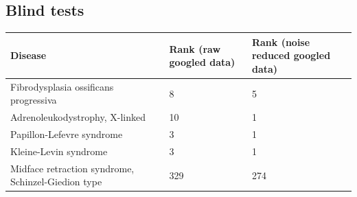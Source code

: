 \documentclass[10pt,letterpaper,final]{article}
\begin{document}
\newpage
\subsection{Blind tests}

\begin{center}
\begin{small}
	\begin{tabular}{|p{3.5cm}|p{1.8cm}|p{1.8cm}|}
	\hline
	\textbf{Disease}  & \textbf{Rank (raw googled data)} & \textbf{Rank (noise reduced googled data)} \\
	\hline\hline
    Fibrodysplasia ossificans progressiva & 8 & 5\\
    \hline
    Adrenoleukodystrophy, X-linked & 10 & 1 \\
    \hline
    Papillon-Lefevre syndrome & 3 & 1\\
    \hline
    Kleine-Levin syndrome  & 3 & 1\\
    \hline
    Midface retraction syndrome, Schinzel-Giedion type  & 329 & 274\\
    \hline
	\end{tabular}
\label{tab:results_blindtest}
\end{small}
\end{center}
\end{document}
